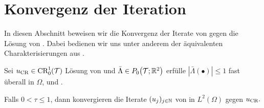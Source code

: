 \section{Konvergenz der Iteration}
In diesen Abschnitt beweisen wir die Konvergenz der Iterate von
 gegen die Lösung von
. 
Dabei bedienen wir uns unter anderem der äquivalenten Charakterisierungen aus
.

\begin{theorem}
  Sei $u_\textup{CR}\in \textup{CR}^1_0(\mathcal{T})$ Lösung von  und
  $\bar\Lambda\in P_0\!\left(\mathcal{T};\mathbb{R}^2\right)$ erfülle
  $\left|\bar\Lambda(\bullet)\right|\leq 1$ fast überall in $\Omega$,
   und
  .

  Falls $0 < \tau \leq 1$, dann konvergieren die Iterate $(u_j)_{j\in\mathbb{N}}$ von
   in $L^2(\Omega)$ gegen $u_\textup{CR}.$
\end{theorem}

